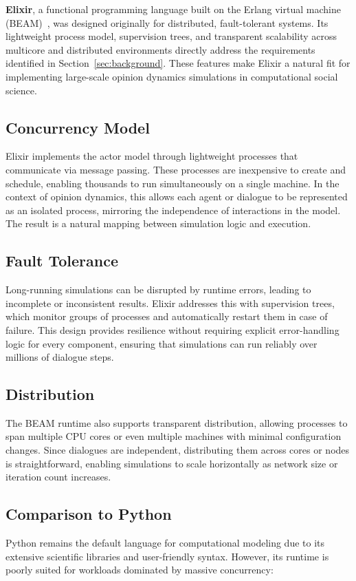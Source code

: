 \documentclass[
]{ceurart}
\begin{document}
\textbf{Elixir}, a functional programming language built on the Erlang virtual machine (BEAM)~\cite{Elixir2025}, was designed originally for distributed, fault-tolerant systems. Its lightweight process model, supervision trees, and transparent scalability across multicore and distributed environments directly address the requirements identified in Section~\ref{sec:background}. These features make Elixir a natural fit for implementing large-scale opinion dynamics simulations in computational social science.

\subsection{Concurrency Model}
Elixir implements the actor model through lightweight processes that communicate via message passing. These processes are inexpensive to create and schedule, enabling thousands to run simultaneously on a single machine. In the context of opinion dynamics, this allows each agent or dialogue to be represented as an isolated process, mirroring the independence of interactions in the model. The result is a natural mapping between simulation logic and execution.

\subsection{Fault Tolerance}
Long-running simulations can be disrupted by runtime errors, leading to incomplete or inconsistent results. Elixir addresses this with supervision trees, which monitor groups of processes and automatically restart them in case of failure. This design provides resilience without requiring explicit error-handling logic for every component, ensuring that simulations can run reliably over millions of dialogue steps.

\subsection{Distribution}
The BEAM runtime also supports transparent distribution, allowing processes to span multiple CPU cores or even multiple machines with minimal configuration changes. Since dialogues are independent, distributing them across cores or nodes is straightforward, enabling simulations to scale horizontally as network size or iteration count increases.

\subsection{Comparison to Python}
Python remains the default language for computational modeling due to its extensive scientific libraries and user-friendly syntax. However, its runtime is poorly suited for workloads dominated by massive concurrency:
\end{document}
